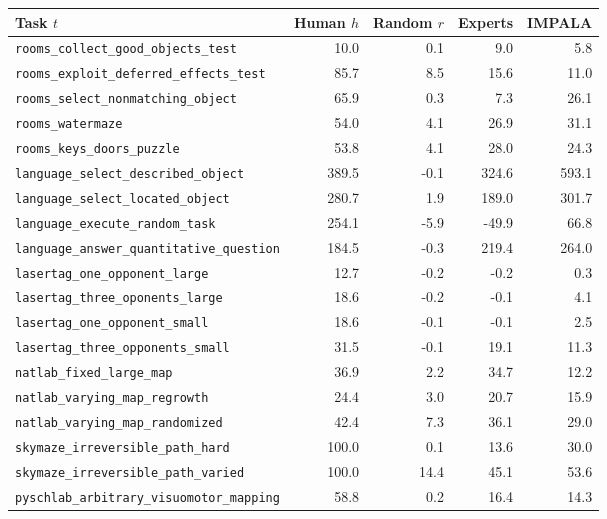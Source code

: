 \begin{tabular}{l@{\hspace{.22cm}}r@{\hspace{.22cm}}r@{\hspace{.22cm}}r@{\hspace{.22cm}}r@{\hspace{.22cm}}}
\toprule
\textbf{Task $t$} &  \textbf{Human $h$} & \textbf{Random $r$} & \textbf{Experts} & \textbf{IMPALA}  \\ \midrule
\texttt{rooms\_collect\_good\_objects\_test} & 10.0 & 0.1 &  9.0 & 5.8 \\
\texttt{rooms\_exploit\_deferred\_effects\_test} & 85.7 & 8.5 & 15.6 & 11.0 \\
\texttt{rooms\_select\_nonmatching\_object} & 65.9 & 0.3 &  7.3 & 26.1 \\
\texttt{rooms\_watermaze} & 54.0 & 4.1 &  26.9 & 31.1 \\
\texttt{rooms\_keys\_doors\_puzzle} & 53.8 & 4.1 & 28.0 & 24.3 \\
\texttt{language\_select\_described\_object} & 389.5 & -0.1 & 324.6 & 593.1 \\
\texttt{language\_select\_located\_object} & 280.7 & 1.9 & 189.0 & 301.7 \\
\texttt{language\_execute\_random\_task} & 254.1 & -5.9 & -49.9 & 66.8 \\
\texttt{language\_answer\_quantitative\_question} & 184.5 & -0.3 & 219.4 & 264.0 \\
\texttt{lasertag\_one\_opponent\_large} & 12.7 & -0.2 & -0.2 & 0.3 \\
\texttt{lasertag\_three\_oponents\_large} & 18.6 & -0.2 & -0.1 & 4.1 \\
\texttt{lasertag\_one\_opponent\_small} & 18.6 & -0.1 & -0.1 & 2.5 \\
\texttt{lasertag\_three\_opponents\_small} & 31.5 & -0.1 & 19.1 & 11.3 \\
\texttt{natlab\_fixed\_large\_map} & 36.9 & 2.2 &  34.7 & 12.2 \\
\texttt{natlab\_varying\_map\_regrowth} & 24.4 & 3.0 &  20.7 & 15.9 \\
\texttt{natlab\_varying\_map\_randomized} & 42.4 & 7.3 &  36.1 & 29.0 \\
\texttt{skymaze\_irreversible\_path\_hard} & 100.0 & 0.1 & 13.6 & 30.0 \\
\texttt{skymaze\_irreversible\_path\_varied} & 100.0 & 14.4 & 45.1 & 53.6 \\
\texttt{pyschlab\_arbitrary\_visuomotor\_mapping} & 58.8 & 0.2 &  16.4 & 14.3 \\

\end{tabular}
